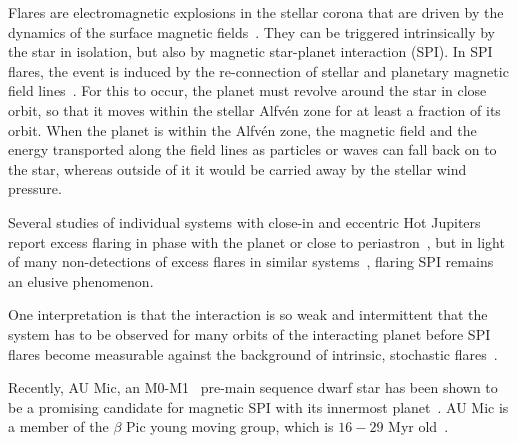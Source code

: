 \documentclass[fleqn,usenatbib,letters]{mnras}%
\begin{document}
Flares are electromagnetic explosions in the stellar corona that are driven by the dynamics of the surface magnetic fields~\citep{benz2010}. They can be triggered intrinsically by the star in isolation, but also by magnetic star-planet interaction (SPI). In SPI flares, the event is induced by the re-connection of stellar and planetary magnetic field lines~\citep{saur2013,lanza2018close-by,fischer2019}. For this to occur, the planet must revolve around the star in close orbit, so that it moves within the stellar Alfv\'en zone for at least a fraction of its orbit. When the planet is within the Alfv\'en zone, the magnetic field and the energy transported along the field lines as particles or waves can fall back on to the star, whereas outside of it it would be carried away by the stellar wind pressure. 



Several studies of individual systems with close-in and eccentric Hot Jupiters report excess flaring in phase with the planet or close to periastron~\citep{shkolnik2005,pillitteri2011,maggio2015}, but in light of many non-detections of excess flares in similar systems~\citep{figueira2016, fischer2019}, flaring SPI remains an elusive phenomenon. 

One interpretation is that the interaction is so weak and intermittent that the system has to be observed for many orbits of the interacting planet before SPI flares become measurable against the background of intrinsic, stochastic flares~\citep{shkolnik2008,lanza2009, saur2013,strugarek2015}.

Recently, AU Mic, an M0-M1~\citep{pecaut2013,gaidos2014} pre-main sequence dwarf star has been shown to be a promising candidate for magnetic SPI with its innermost planet~\citep{kavanagh2021}. AU Mic is a member of the $\beta$ Pic young moving group, which is $16-29$ Myr old~\citep{malo2014,binks2014,mamajek2014,bell2015,binks2016,shkolnik2017,miretroig2020}. %
\end{document}
